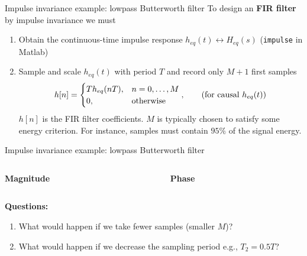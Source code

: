 \documentclass[10pt, handout]{beamer}
\begin{document}
%
\begin{frame}{Impulse invariance example: lowpass Butterworth filter}
To design an \textbf{FIR filter} by impulse invariance we must
\begin{enumerate}
	\item Obtain the continuous-time impulse response $h_{eq}(t) \longleftrightarrow H_{eq}(s)$ (\texttt{impulse} in Matlab)
	\item Sample and scale $h_{eq}(t)$ with period $T$ and record only $M+1$ first samples 
	\begin{equation*}
		h[n] = \begin{cases}
		Th_{eq}(nT), & n = 0, \ldots, M \\
		0, & \text{otherwise}
		\end{cases}, \tag{for causal $h_{eq}(t)$}
	\end{equation*}
	$h[n]$ is the FIR filter coefficients. $M$ is typically chosen to satisfy some energy criterion. For instance, samples must contain $95\%$ of the signal energy.
\end{enumerate} 
\begin{center}
	\resizebox{0.7\linewidth}{!}{}
\end{center}

\end{frame}

%
\begin{frame}{Impulse invariance example: lowpass Butterworth filter}

\begin{columns}
	\begin{column}{0.5\textwidth}
		\textbf{Magnitude}
		\begin{center}
			\resizebox{\linewidth}{!}{}
		\end{center}
	\end{column}
	\begin{column}{0.5\textwidth}
		\textbf{Phase}
		\begin{center}
			\resizebox{\linewidth}{!}{}
		\end{center}
	\end{column}
\end{columns}

\vspace{0.2cm}
\textbf{Questions:}
\begin{enumerate}
	\item What would happen if we take fewer samples (smaller $M$)?
	\item What would happen if we decrease the sampling period e.g., $T_2 = 0.5T$?
\end{enumerate}

\end{frame}
\end{document}
